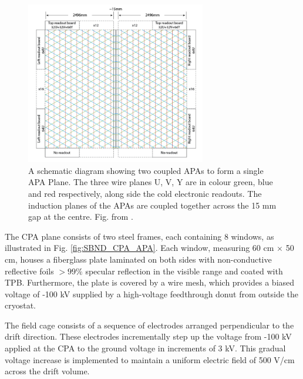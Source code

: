 \begin{figure}[hbp] 
\centering    
\includegraphics[width=0.70\textwidth]{SBND_APA}
\caption[SBND_APA]{
A schematic diagram showing two coupled APAs to form a single APA Plane.
The three wire planes U, V, Y are in colour green, blue and red respectively, along side the cold electronic readouts.
The induction planes of the APAs are coupled together across the 15 mm gap at the centre.
Fig. from \cite{SBNProposal}.
}
\label{fig:SBND_APA}
\end{figure}

The CPA plane consists of two steel frames, each containing 8 windows, as illustrated in Fig. \ref{fig:SBND_CPA_APA}. 
Each window, measuring 60 cm $\times$ 50 cm, houses a fiberglass plate laminated on both sides with non-conductive reflective foils $> 99\%$ specular reflection in the visible range and coated with TPB.
Furthermore, the plate is covered by a wire mesh, which provides a biased voltage of -100 kV supplied by a high-voltage feedthrough donut from outside the cryostat.

The field cage consists of a sequence of electrodes arranged perpendicular to the drift direction. 
These electrodes incrementally step up the voltage from -100 kV applied at the CPA to the ground voltage in increments of 3 kV. 
This gradual voltage increase is implemented to maintain a uniform electric field of 500 V/cm across the drift volume.


